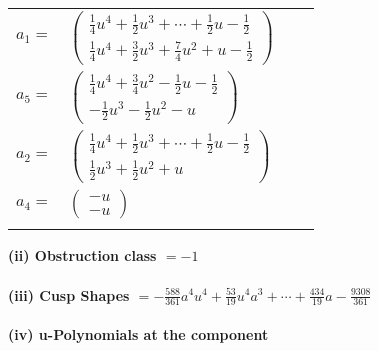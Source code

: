 \documentclass[1p]{elsarticle_modified}
\theoremstyle{definition}
\begin{document}
\begin{tabular}{m{7pt} m{180pt} m{7pt} m{180pt} }
\flushright $a_{1}=$&$\begin{pmatrix}\frac{1}{4} u^4+\frac{1}{2} u^3+\cdots+\frac{1}{2} u-\frac{1}{2}\\\frac{1}{4} u^4+\frac{3}{2} u^3+\frac{7}{4} u^2+u-\frac{1}{2}\end{pmatrix}$ \\
\flushright $a_{5}=$&$\begin{pmatrix}\frac{1}{4} u^4+\frac{3}{4} u^2-\frac{1}{2} u-\frac{1}{2}\\-\frac{1}{2} u^3-\frac{1}{2} u^2- u\end{pmatrix}$ \\
\flushright $a_{2}=$&$\begin{pmatrix}\frac{1}{4} u^4+\frac{1}{2} u^3+\cdots+\frac{1}{2} u-\frac{1}{2}\\\frac{1}{2} u^3+\frac{1}{2} u^2+u\end{pmatrix}$ \\
\flushright $a_{4}=$&$\begin{pmatrix}- u\\- u\end{pmatrix}$\\&\end{tabular}
\flushleft \textbf{(ii) Obstruction class $= -1$}\\~\\
\flushleft \textbf{(iii) Cusp Shapes $= -\frac{588}{361} a^4 u^4+\frac{53}{19} u^4 a^3+\cdots+\frac{434}{19} a-\frac{9308}{361}$}\\~\\
\newpage\renewcommand{\arraystretch}{1}
\flushleft \textbf{(iv) u-Polynomials at the component}\newline \\
\end{document}
